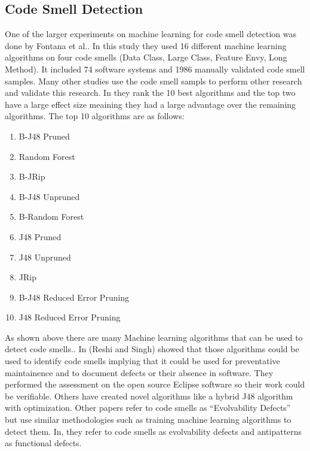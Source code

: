 \documentclass[conference]{IEEEtran}
\begin{document}
\subsection{Code Smell Detection}
One of the larger experiments on machine learning for code smell detection was done by Fontana et al.\cite{arcelli_fontana_comparing_2016}. In this study they used 16 different machine learning algorithms on four code smells (Data Class, Large Class, Feature Envy, Long Method). It included 74 software systems and 1986 manually validated code smell samples. Many other studies use the code smell sampls to perform other research and validate this research. 
In\cite{arcelli_fontana_comparing_2016} they rank the 10 best algorithms and the top two have a large effect size meaining they had a large advantage over the remaining algorithms.
The top 10 algorithms are as follows:
\begin{enumerate}
\item B-J48 Pruned
\item Random Forest
\item B-JRip
\item B-J48 Unpruned
\item B-Random Forest
\item J48 Pruned
\item J48 Unpruned
\item JRip
\item B-J48 Reduced Error Pruning
\item J48 Reduced Error Pruning
\end{enumerate}
As shown above there are many Machine learning algorithms that can be used to detect code smells.\cite{reshi_investigating_2019}\cite{karaduzovic-hadziabdic_comparison_2018}\cite{reshi_predicting_2018}\cite{nucci_detecting_2018}\cite{karaduzovic-hadziabdic_comparison_2018}. In\cite{reshi_investigating_2019}\cite{reshi_predicting_2018} (Reshi and Singh) showed that those algorithms could be used to identify code smells implying that it could be used for preventative maintainence and to document defects or their absence in software. 
They performed the assessment on the open source Eclipse software so their work could be verifiable. Others have created novel algorithms\cite{kaur_sp-j48:_2019} like a hybrid J48 algorithm with optimization.
Other papers refer to code smells as ``Evolvability Defects''\cite{tsuda_machine_2018} but use similar methodologies such as training machine learning algorithms to detect them. In\cite{tsuda_machine_2018}, they refer to code smells as evolvability defects and antipatterns as functional defects.
\end{document}
